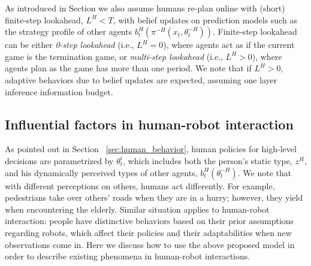 \documentclass[letterpaper, 10 pt, conference]{ieeeconf}  %
\begin{document}
As introduced in Section
we also assume humans re-plan 
online with (short) finite-step lookahead, $L^H<T$, with belief updates on prediction 
models such as the strategy profile of other agents 
$b^H_t(\pi^{-H}(x_t,\theta^{-H}_t))$. Finite-step lookahead can be either 
\textit{0-step lookahead} (i.e., $L^H=0$), where agents act as if the current 
game is the termination game, or \textit{multi-step lookahead} (i.e., $L^H>0$), 
where agents plan as the game has more than one period. We note that if $L^H>0$, 
adaptive behaviors due to belief updates are expected, assuming one layer inference information budget.




\subsection{Influential factors in human-robot interaction}
As pointed out in Section ~\ref{sec:human_behavior}, human policies for high-level decisions are parametrized by $\theta^i_t$, which includes both the person's static type, $z^H$, and his dynamically perceived types of other agents, $b^H_t(\theta^{-H}_t)$. We note that with different perceptions on others, humans act differently. For example, pedestrians take over others' roads when they are in a hurry; however, they yield when encountering the elderly. Similar situation 
applies to human-robot interaction: people have distinctive behaviors based on their prior assumptions regarding robots, which affect their policies and their adaptabilities when new observations come in. Here we discuss how to use the above proposed model in order to describe	 existing phenomena in human-robot interactions. 
\end{document}
